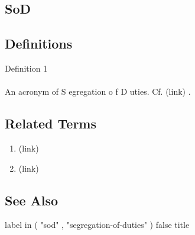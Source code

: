 \newpage \subsection*{SoD } \subsection*{Definitions } \begin{DIC_Def}{Definition 1 }{} \paragraph{} An acronym of  S  egregation  o  f  D  uties. Cf.  (link) \href{Segregation of Duties (Dictionary Entry) }{ } .  \end{DIC_Def} \subsection*{Related Terms } \begin{enumerate} \item  (link) \href{4-Eyes Principle (Dictionary Entry) }{ }   \item  (link) \href{Segregation of Duties (Dictionary Entry) }{ }   \end{enumerate} \subsection*{See Also } label in ( "sod" , "segregation-of-duties" )  false  title  